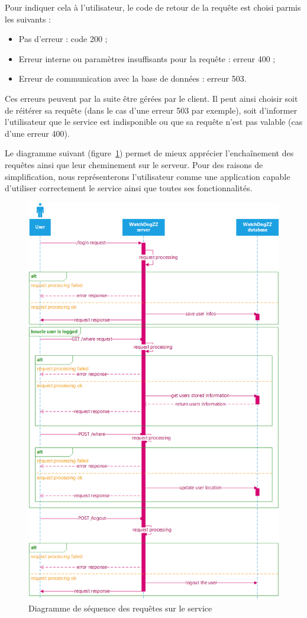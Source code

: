 Pour indiquer cela à l'utilisateur, le code de retour de la requête est choisi parmis les suivants :
\begin{itemize}
    \item Pas d'erreur : code 200 ;
    \item Erreur interne ou paramètres insuffisants pour la requête : erreur 400 ;
    \item Erreur de communication avec la base de données : erreur 503.
\end{itemize}

Ces erreurs peuvent par la suite être gérées par le client. Il peut ainsi choisir soit de réitérer sa requête (dans le cas d'une erreur 503 par exemple), soit d'informer l'utilisateur que le service est indisponible ou que sa requête n'est pas valable (cas d'une erreur 400).

Le diagramme suivant (figure~\ref{servicereq}) permet de mieux apprécier l'enchaînement des requêtes ainsi que leur cheminement sur le serveur. Pour des raisons de simplification, nous représenterons l'utilisateur comme une application capable d'utiliser correctement le service ainsi que toutes ses fonctionnalités.

\begin{figure}[H]
    \centering
    \includegraphics[height=0.99\textheight]{./img/server-requests.png}
    \caption{Diagramme de séquence des requêtes sur le service}
    \label{servicereq}
\end{figure}
